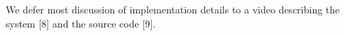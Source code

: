 We defer most discussion of implementation details to a video describing the system [8] and the source
code [9].
